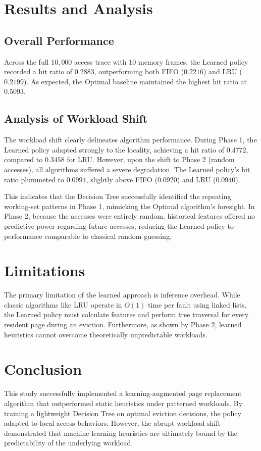 \documentclass[10pt,twocolumn,letterpaper]{article}
\begin{document}
\section{Results and Analysis}

\subsection{Overall Performance}
Across the full $10,000$ access trace with $10$ memory frames, the Learned policy recorded a hit ratio of $0.2883$, outperforming both FIFO ($0.2216$) and LRU ($0.2199$). As expected, the Optimal baseline maintained the highest hit ratio at $0.5093$. 

\subsection{Analysis of Workload Shift}
The workload shift clearly delineates algorithm performance. During Phase 1, the Learned policy adapted strongly to the locality, achieving a hit ratio of $0.4772$, compared to $0.3458$ for LRU. However, upon the shift to Phase 2 (random accesses), all algorithms suffered a severe degradation. The Learned policy's hit ratio plummeted to $0.0994$, slightly above FIFO ($0.0920$) and LRU ($0.0940$). 

This indicates that the Decision Tree successfully identified the repeating working-set patterns in Phase 1, mimicking the Optimal algorithm's foresight. In Phase 2, because the accesses were entirely random, historical features offered no predictive power regarding future accesses, reducing the Learned policy to performance comparable to classical random guessing.

\section{Limitations}
The primary limitation of the learned approach is inference overhead. While classic algorithms like LRU operate in $O(1)$ time per fault using linked lists, the Learned policy must calculate features and perform tree traversal for every resident page during an eviction. Furthermore, as shown by Phase 2, learned heuristics cannot overcome theoretically unpredictable workloads.

\section{Conclusion}
This study successfully implemented a learning-augmented page replacement algorithm that outperformed static heuristics under patterned workloads. By training a lightweight Decision Tree on optimal eviction decisions, the policy adapted to local access behaviors. However, the abrupt workload shift demonstrated that machine learning heuristics are ultimately bound by the predictability of the underlying workload.



\end{document}
